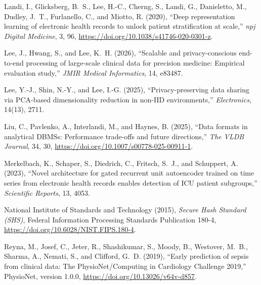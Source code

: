 \begin{thebibliography}{}
Landi, I., Glicksberg, B.~S., Lee, H.-C., Cherng, S., Landi, G., Danieletto, M., Dudley, J.~T., Furlanello, C., and Miotto, R. (2020), \enquote{Deep representation learning of electronic health records to unlock patient stratification at scale,} \emph{npj Digital Medicine}, 3, 96, \url{https://doi.org/10.1038/s41746-020-0301-z}.

Lee, J., Hwang, S., and Lee, K.~H. (2026), \enquote{Scalable and privacy-conscious end-to-end processing of large-scale clinical data for precision medicine: Empirical evaluation study,} \emph{JMIR Medical Informatics}, 14, e83487.

Lee, Y.-J., Shin, N.-Y., and Lee, I.-G. (2025), \enquote{Privacy-preserving data sharing via PCA-based dimensionality reduction in non-IID environments,} \emph{Electronics}, 14(13), 2711.

Liu, C., Pavlenko, A., Interlandi, M., and Haynes, B. (2025), \enquote{Data formats in analytical DBMSs: Performance trade-offs and future directions,} \emph{The VLDB Journal}, 34, 30, \url{https://doi.org/10.1007/s00778-025-00911-1}.

Merkelbach, K., Schaper, S., Diedrich, C., Fritsch, S.~J., and Schuppert, A. (2023), \enquote{Novel architecture for gated recurrent unit autoencoder trained on time series from electronic health records enables detection of ICU patient subgroups,} \emph{Scientific Reports}, 13, 4053.

National Institute of Standards and Technology (2015), \emph{Secure Hash Standard (SHS)}, Federal Information Processing Standards Publication 180-4, \url{https://doi.org/10.6028/NIST.FIPS.180-4}.

Reyna, M., Josef, C., Jeter, R., Shashikumar, S., Moody, B., Westover, M.~B., Sharma, A., Nemati, S., and Clifford, G.~D. (2019), \enquote{Early prediction of sepsis from clinical data: The PhysioNet/Computing in Cardiology Challenge 2019,} PhysioNet, version 1.0.0, \url{https://doi.org/10.13026/v64v-d857}.


\end{thebibliography}
